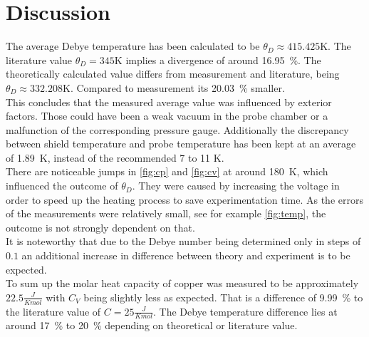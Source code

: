 \newpage
\section{Discussion}
\label{sec:diskussion}

The average Debye temperature has been calculated to be $\theta_D \approx 415.425\si{\kelvin}$.
The literature value $\theta_D = 345\si{\kelvin}$ implies a divergence of around \SI{16.95}{\percent}.
The theoretically calculated value differs from measurement and literature, being $\theta_D \approx 332.208\si{\kelvin}$.
Compared to measurement its \SI{20.03}{\percent} smaller.\\
This concludes that the measured average value was influenced by exterior factors.
Those could have been a weak vacuum in the probe chamber or a malfunction of the corresponding pressure gauge.
Additionally the discrepancy between shield temperature and probe temperature has been kept at an average of \SI{1.89}{\kelvin}, instead of the recommended 7 to 11 \si{\kelvin}.\\
There are noticeable jumps in \autoref{fig:cp} and \autoref{fig:cv} at around \SI{180}{\kelvin}, which influenced the outcome of $\theta_D$.
They were caused by increasing the voltage in order to speed up the heating process to save experimentation time.
As the errors of the measurements were relatively small, see for example \autoref{fig:temp}, the outcome is not strongly dependent on that.\\
It is noteworthy that due to the Debye number being determined only in steps of $0.1$ an additional increase in difference between theory and experiment is to be expected.\\
\newline
To sum up the molar heat capacity of copper was measured to be approximately $22.5\frac{J}{Kmol}$ with $C_V$ being slightly less as expected.
That is a difference of \SI{9.99}{\percent} to the literature value of $C = 25\frac{J}{Kmol}$\cite{copper2}.
The Debye temperature difference lies at around \SI{17}{\percent} to \SI{20}{\percent} depending on theoretical or literature value.